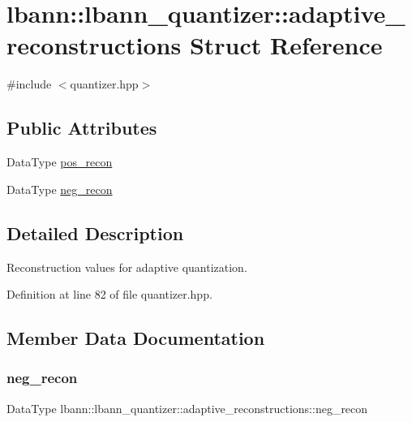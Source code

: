 \hypertarget{structlbann_1_1lbann__quantizer_1_1adaptive__reconstructions}{}\section{lbann\+:\+:lbann\+\_\+quantizer\+:\+:adaptive\+\_\+reconstructions Struct Reference}
\label{structlbann_1_1lbann__quantizer_1_1adaptive__reconstructions}


{\ttfamily \#include $<$quantizer.\+hpp$>$}

\subsection*{Public Attributes}
\begin{DoxyCompactItemize}
\item 
Data\+Type \hyperlink{structlbann_1_1lbann__quantizer_1_1adaptive__reconstructions_a9b3b4970e067920e056cdd54c2ad8e95}{pos\+\_\+recon}
\item 
Data\+Type \hyperlink{structlbann_1_1lbann__quantizer_1_1adaptive__reconstructions_a631231c118cc17ba4ed569380e6c6711}{neg\+\_\+recon}
\end{DoxyCompactItemize}


\subsection{Detailed Description}
Reconstruction values for adaptive quantization. 

Definition at line 82 of file quantizer.\+hpp.



\subsection{Member Data Documentation}
\mbox{\label{structlbann_1_1lbann__quantizer_1_1adaptive__reconstructions_a631231c118cc17ba4ed569380e6c6711}} 
\subsubsection{\texorpdfstring{neg\+\_\+recon}{neg\_recon}}
{\footnotesize\ttfamily Data\+Type lbann\+::lbann\+\_\+quantizer\+::adaptive\+\_\+reconstructions\+::neg\+\_\+recon}

